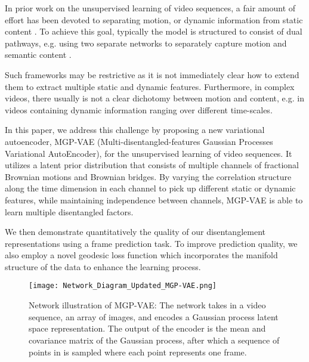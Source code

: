 \documentclass[runningheads]{llncs}
\begin{document}
   In prior work on the unsupervised learning of video sequences, a fair amount of effort has been devoted to separating motion, or dynamic information from static content \cite{Denton2017UnsupervisedLO,Grathwohl2016DisentanglingSA,Hsieh2018LearningTD,Li2018DisentangledSA,Villegas2017DecomposingMA}. To achieve this goal, typically the model is structured to consist of dual pathways, e.g. using two separate networks to separately capture motion and semantic content \cite{Denton2017UnsupervisedLO,Villegas2017DecomposingMA}. \par 

   Such frameworks may be restrictive as it is not immediately clear how to extend them to extract multiple static and dynamic features. Furthermore, in complex videos, there usually is not a clear dichotomy between motion and content, e.g. in videos containing dynamic information ranging over different time-scales. \par 

   In this paper, we address this challenge by proposing a new variational autoencoder, MGP-VAE (Multi-disentangled-features Gaussian Processes Variational AutoEncoder), for the unsupervised learning of video sequences. It utilizes a latent prior distribution that consists of multiple channels of fractional Brownian motions and Brownian bridges. By varying the correlation structure along the time dimension in each channel to pick up different static or dynamic features, while maintaining independence between channels, MGP-VAE is able to learn multiple disentangled factors. \par
   
   We then demonstrate quantitatively the quality of our disentanglement representations using a frame prediction task. To improve prediction quality, we also employ a novel geodesic loss function which incorporates the manifold structure of the data to enhance the learning process. \par 
   
   \begin{figure} 
   \centering  
    \texttt{[image: Network\_Diagram\_Updated\_MGP-VAE.png]}
   \caption{Network illustration of MGP-VAE: The network takes in a video sequence, an array of images, and encodes a Gaussian process latent space representation. The output of the encoder is the mean and covariance matrix of the Gaussian process, after which a sequence of points in  is sampled where each point represents one frame.}
   \end{figure}
\end{document}
